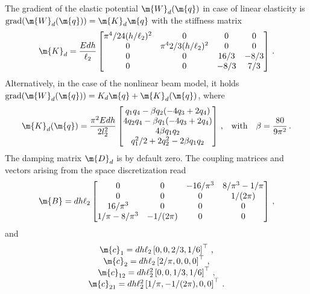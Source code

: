 The gradient of the elastic potential $\m{W}_{d}(\m{q})$ in case of linear elasticity is $\mathrm{grad}(\m{W}_{d}(\m{q})) = \m{K}_{d} \m{q}$ with the stiffness matrix
%
\begin{equation*}
  \m{K}_{d} = \dfrac{E d h}{\ell_2} \begin{bmatrix}
    \pi^4/24(h/\ell_2)^2 & 0                    & 0    & 0    \\
    0                   & \pi^4 2/3(h/\ell_2)^2 & 0    & 0    \\
    0                   & 0                     & 16/3 & -8/3 \\
    0                   & 0                     & -8/3 & 7/3
  \end{bmatrix} \, \text{.}
\end{equation*}
%
Alternatively, in the case of the nonlinear beam model, it holds $\mathrm{grad}(\m{W}_{d}(\m{q})) = K_{d}\m{q} + \m{K}_{d}(\m{q})$, where
%
\begin{equation*}
  \m{K}_{d}(\m{q}) = \dfrac{\pi^2 E d h}{2l_2^2} \begin{bmatrix}
    q_1 q_4 - \beta q_2(-4q_3 + 2q_4) \\
    4 q_2 q_4 - \beta q_1(-4q_3 + 2q_4) \\
    4 \beta q_1 q_2 \\
    q_1^2/2 + 2q_2^2 - 2 \beta q_1 q_2
  \end{bmatrix} \, \text{,}
  \quad \text{with} \quad
  \beta = \dfrac{80}{9\pi^2} \, \text{.}
\end{equation*}
%
The damping matrix $\m{D}_{d}$ is by default zero. The coupling matrices and vectors arising from the space discretization read
%
\begin{equation*}
  \m{B} = d h \ell_2 \begin{bmatrix}
    0             & 0         & -16/\pi^3 & 8/\pi^3-1/\pi \\
    0             & 0         & 0         & 1/(2\pi)      \\
    16/\pi^3      & 0         & 0         & 0             \\
    1/\pi-8/\pi^3 & -1/(2\pi) & 0         & 0
  \end{bmatrix} \, \text{,}
\end{equation*}
%
and
%
\begin{equation*}
  \begin{matrix}
    \m{c}_{1}  = d h \ell_2  \left[ 0,     0,         2/3, 1/6 \right]^\top \, \text{,} \\
    \m{c}_{2}  = d h \ell_2  \left[ 2/\pi, 0,         0,   0   \right]^\top \, \text{,} \\
    \m{c}_{12} = d h \ell_2^2\left[ 0,     0,         1/3, 1/6 \right]^\top \, \text{,} \\
    \m{c}_{21} = d h \ell_2^2\left[ 1/\pi, -1/(2\pi), 0,   0   \right]^\top \, \text{.}
  \end{matrix}
\end{equation*}
